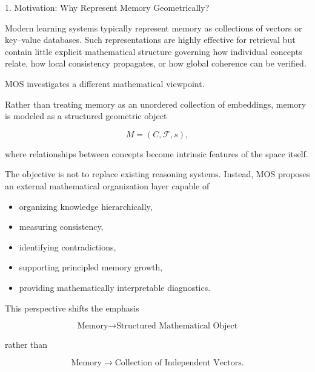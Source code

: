 %
%

\begin{mosbox}{1. Motivation: Why Represent Memory Geometrically?}

\BodyFont

Modern learning systems typically represent memory as collections of
vectors or key--value databases. Such representations are highly effective
for retrieval but contain little explicit mathematical structure governing
how individual concepts relate, how local consistency propagates, or how
global coherence can be verified.

MOS investigates a different mathematical viewpoint.

Rather than treating memory as an unordered collection of embeddings,
memory is modeled as a structured geometric object

\[
M=(C,\mathcal F,s),
\]

where relationships between concepts become intrinsic features of the
space itself.

\vspace{4mm}

The objective is not to replace existing reasoning systems.
Instead, MOS proposes an external mathematical organization layer capable
of

\begin{itemize}

\item organizing knowledge hierarchically,

\item measuring consistency,

\item identifying contradictions,

\item supporting principled memory growth,

\item providing mathematically interpretable diagnostics.

\end{itemize}

\vspace{4mm}

This perspective shifts the emphasis

\[
\boxed{
\text{Memory}
\longrightarrow
\text{Structured Mathematical Object}
}
\]

rather than

\[
\boxed{
\text{Memory}
\longrightarrow
\text{Collection of Independent Vectors}.
}
\]

\end{mosbox}


